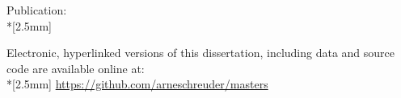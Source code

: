 \pagestyle{empty}
\vspace*{\fill}
\small

\noindent
\textsf{Publication:}\\*[2.5mm]
\textsf{
    \fontsize{9}{10pt}
    \selectfont
}
\vspace{1cm}

\noindent
\textsf{Electronic, hyperlinked versions of this dissertation, including
    data and source code are available online at:}\\*[2.5mm]
\textsf{
    \fontsize{9}{10pt}
    \selectfont
    \url{https://github.com/arneschreuder/masters}
}
\newpage
